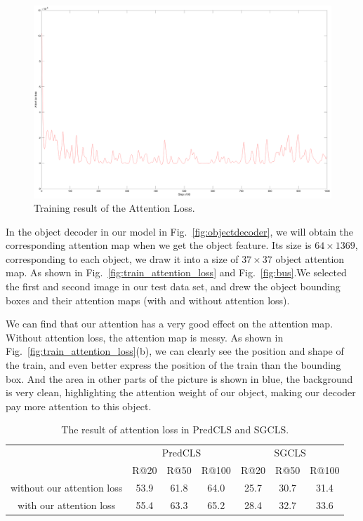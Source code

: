 \begin{figure}[h!]
	\centering
	\includegraphics[width=0.9\linewidth]{figures/result/attention_loss}
	\caption[Training result of the Attention Loss]{Training result of the Attention Loss.}
	\label{fig:attention_loss_result}
\end{figure}

In the object decoder in our model in Fig.~\ref{fig:objectdecoder}, we will obtain the corresponding attention map when we get the object feature. Its size is $ 64\times1369 $, corresponding to each object, we draw it into a size of $ 37\times37 $ object attention map. As shown in Fig.~\ref{fig:train_attention_loss} and Fig.~\ref{fig:bus}.We selected the first and second image in our test data set, and drew the object bounding boxes and their attention maps (with and without attention loss).

We can find that our attention has a very good effect on the attention map. Without attention loss, the attention map is messy. As shown in Fig.~\ref{fig:train_attention_loss}(b), we can clearly see the position and shape of the train, and even better express the position of the train than the bounding box. And the area in other parts of the picture is shown in blue, the background is very clean, highlighting the attention weight of our object, making our decoder pay more attention to this object.


\begin{table}[!h]
	\centering
	\begin{tabular}{c|ccc|ccc}
		\bottomrule
		\multirow{2}{*}{}           & \multicolumn{3}{c|}{PredCLS} & \multicolumn{3}{c}{SGCLS} \\ \cline{2-7} 
		& R@20    & R@50    & R@100    & R@20   & R@50   & R@100   \\ \hline
		without our attention  loss & 53.9      & 61.8       & 64.0       & 25.7     & 30.7     & 31.4   \\
		with our attention loss     & 55.4       & 63.3       & 65.2        & 28.4      & 32.7      &33.6     \\ \bottomrule
	\end{tabular}

\caption[The result of attention loss in PredCLS and SGCLS]{The result of attention loss in PredCLS and SGCLS.}
\label{tab:result_attetnion_loss}
\end{table}


